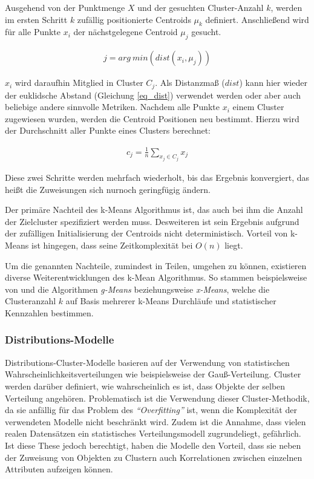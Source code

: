 Ausgehend von der Punktmenge $X$ und der gesuchten Cluster-Anzahl $k$,
werden im ersten Schritt $k$ zufällig positionierte Centroids $\mu_k$ definiert.
Anschließend wird für alle Punkte $x_i$ der nächstgelegene Centroid $\mu_j$ gesucht.

\begin{ceqn}
\begin{align}
    \label{eq_kmeans2}
    j = arg\ min(dist(x_i, \mu_j))
\end{align}
\end{ceqn}

$x_i$ wird daraufhin Mitglied in Cluster $C_j$. Als Distanzmaß ($dist$) kann hier wieder der euklidsche Abstand
(Gleichung \ref{eq_dist}) verwendet werden oder aber auch beliebige andere sinnvolle Metriken.
Nachdem alle Punkte $x_i$ einem Cluster zugewiesen wurden, werden die Centroid Positionen neu bestimmt.
Hierzu wird der Durchschnitt aller Punkte eines Clusters berechnet:

\begin{ceqn}
\begin{align}
    \label{eq_kmeans3}
    c_j = \frac{1}{n} \sum_{x_j \in C_j} x_j
\end{align}
\end{ceqn}

Diese zwei Schritte werden mehrfach wiederholt, bis das Ergebnis konvergiert, das heißt die Zuweisungen sich
nurnoch geringfügig ändern. \cite[]{Jain2010}

Der primäre Nachteil des k-Means Algorithmus ist, das auch bei ihm die Anzahl der Zielcluster spezifiziert
werden muss. Desweiteren ist sein Ergebnis aufgrund der zufälligen Initialisierung der Centroids
nicht deterministisch. Vorteil von k-Means ist hingegen, dass seine Zeitkomplexität bei $O(n)$ liegt.

Um die genannten Nachteile, zumindest in Teilen, umgehen zu können, existieren diverse Weiterentwicklungen des k-Mean
Algorithmus. So stammen beispielsweise von \cite[]{Hamerly} und \cite[]{Pelleg} die Algorithmen \textit{g-Means}
beziehungsweise \textit{x-Means}, welche die Clusteranzahl $k$ auf Basis mehrerer k-Means Durchläufe und
statistischer Kennzahlen bestimmen.

\subsubsection{Distributions-Modelle}
\label{sec:grund_distribution_clustering}

Distributions-Cluster-Modelle basieren auf der Verwendung von statistischen Wahrscheinlichkeitsverteilungen wie
beispielsweise der Gauß-Verteilung. Cluster werden darüber definiert, wie wahrscheinlich es ist, dass Objekte
der selben Verteilung angehören. Problematisch ist die Verwendung dieser Cluster-Methodik, da sie anfällig für
das Problem des \textit{``Overfitting''} ist, wenn die Komplexität der verwendeten Modelle nicht beschränkt wird.
Zudem ist die Annahme, dass vielen realen Datensätzen ein statistisches Verteilungsmodell zugrundeliegt, gefährlich.
Ist diese These jedoch berechtigt, haben die Modelle den Vorteil, dass sie neben der Zuweisung von Objekten zu Clustern
auch Korrelationen zwischen einzelnen Attributen aufzeigen können. \cite[]{AndersDrachen2014}

